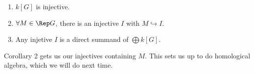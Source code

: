 \documentclass[12pt]{article}
\begin{document}
\begin{thm}
	\begin{enumerate}
		\item $k[G]$ is injective.
		\item $\forall M\in\Rep G$, there is an injective $I$ with $M\hookrightarrow I$.
		\item Any injetive $I$ is a direct summand of $\bigoplus k[G]$.
	\end{enumerate}
\end{thm}
Corollary 2 gets us our injectives containing $M$. This sets us up to do homological algebra, which we will do next time.
\end{document}
